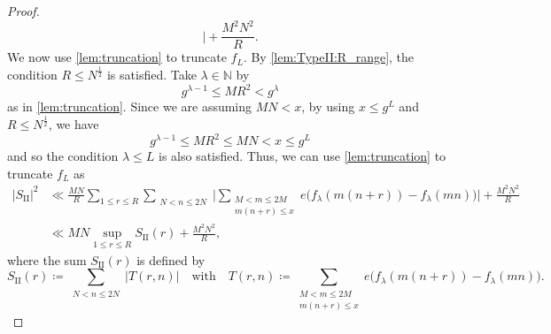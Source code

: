 \documentclass[hidelinks]{amsart}
\numberwithin{equation}{section}
\theoremstyle{plain}
\theoremstyle{definition}
\begin{document}
\begin{proof}
\begin{equation}
\biggr|
+
\frac{M^{2}N^{2}}{R}.
\end{equation}
We now use \cref{lem:truncation} to truncate $f_{L}$.
By \cref{lem:TypeII:R_range}, the condition $R\le N^{\frac{1}{2}}$ is satisfied.
Take $\lambda\in\mathbb{N}$ by
\begin{equation}
\label{lem:TypeII:def:lambda}
g^{\lambda-1}\le MR^{2}<g^{\lambda}
\end{equation}
as in \cref{lem:truncation}.
Since we are assuming $MN<x$, by using $x\le g^{L}$ and $R\le N^{\frac{1}{2}}$, we have
\[
g^{\lambda-1}\le MR^{2}\le MN<x\le g^{L}
\]
and so the condition $\lambda\le L$ is also satisfied.
Thus, we can use \cref{lem:truncation} to truncate $f_{L}$ as
\begin{equation}
\label{lem:TypeII:truncation}
\begin{aligned}
|S_{\mathrm{II}}|^{2}
&\ll
\frac{MN}{R}
\sum_{1\le r\le R}
\sum_{\substack{
N<n\le 2N
}}
\biggl|
\sum_{\substack{
M<m\le 2M\\
m(n+r)\le x
}}
e\bigl(f_{\lambda}(m(n+r))-f_{\lambda}(mn)\bigr)
\biggr|
+
\frac{M^{2}N^{2}}{R}\\
&\ll
MN
\sup_{1\le r\le R}S_{\mathrm{II}}(r)
+
\frac{M^{2}N^{2}}{R},
\end{aligned}
\end{equation}
where the sum $S_{\mathrm{II}}(r)$ is defined by
\begin{equation}
\label{lem:TypeII:def:SII_r}
S_{\mathrm{II}}(r)
\coloneqq
\sum_{\substack{
N<n\le 2N
}}|T(r,n)|
\quad\text{with}\quad
T(r,n)
\coloneqq
\sum_{\substack{
M<m\le 2M\\
m(n+r)\le x
}}
e\bigl(f_{\lambda}(m(n+r))-f_{\lambda}(mn)\bigr).
\end{equation}


\end{proof}
\end{document}
